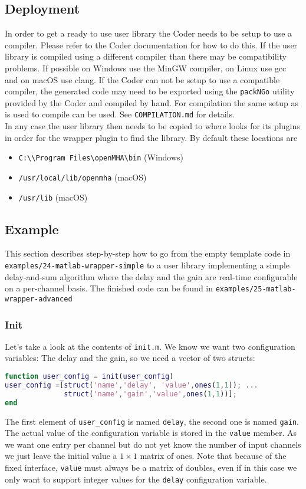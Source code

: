 \documentclass[11pt,a4paper,twoside]{article}
\newcommand{\+}{\discretionary{\mbox{\scriptsize$\hookleftarrow$}}{}{}}
\begin{document}
\subsection{Deployment}
In order to get a ready to use user library the \Matlab{} Coder needs to be
setup to use a compiler. Please refer to the \Matlab{} Coder documentation for
how to do this. If the user library is compiled using a different compiler than
\mha{} there may be compatibility problems. If possible on Windows use the MinGW
compiler, on Linux use gcc and on macOS use clang. If the \Matlab{} Coder
can not be setup to use a compatible compiler, the generated code may need to be
exported using the \texttt{packNGo} utility provided by the \Matlab{} Coder and
compiled by hand. For compilation the same setup as is used to compile \mha{}
can be used. See \texttt{COMPILATION.md} for details. \\
In any case the user library then needs to be copied to where
\mha{} looks for its plugins in order for the wrapper plugin to find the
library. By default these locations are
\begin{itemize}
\item \texttt{C:\textbackslash\textbackslash Program Files\textbackslash openMHA\textbackslash bin} (Windows)
\item \texttt{/usr/local/lib/openmha} (macOS)
\item \texttt{/usr/lib} (macOS)
\end{itemize}
\subsection{Example}
This section describes step-by-step how to go from the empty template code
in \\ \texttt{examples/24-matlab-wrapper-simple}
to a user library implementing a simple delay-and-sum algorithm where the delay
and the gain are real-time configurable on a per-channel basis.
The finished code can be found in \texttt{examples/25-matlab-wrapper-advanced}
\subsubsection*{Init}
Let's take a look at the contents of \texttt{init.m}. We know we want two
configuration variables:
The delay and the gain, so we need a vector of two structs:
\begin{lstlisting}[language=Matlab]
function user_config = init(user_config)
user_config =[struct('name','delay', 'value',ones(1,1)); ...
              struct('name','gain','value',ones(1,1))];
end
\end{lstlisting}
The first element of \texttt{user\_config} is named \texttt{delay}, the second one is named
\texttt{gain}. The actual value of the configuration variable is stored in the \texttt{value}
member. As we want one entry per channel but do not yet know the number of input
channels we just leave the initial value a $1\times1$ matrix of ones. Note that because of
the fixed interface, \texttt{value} must always be a matrix of doubles, even if in this
case we only want to support integer values for the \texttt{delay} configuration variable.
\end{document}
